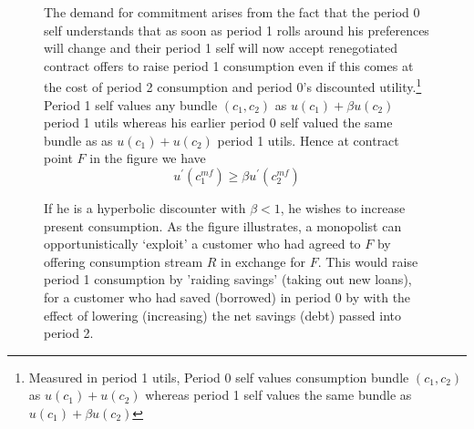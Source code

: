 \documentclass[11pt]{article}%
\begin{document}
\begin{figure}
The demand for commitment arises from the fact that the period 0 self understands that as soon as period 1 rolls around his preferences will change and their period 1 self will now accept renegotiated contract offers to raise period 1 consumption even if this comes at the cost of period 2 consumption and period 0's discounted utility.\footnote{Measured in period 1 utils, Period 0 self values consumption bundle $(c_{1},c_{2})$ as $u(c_{1}) + u(c_{2})$ whereas period 1 self values the same bundle as $u(c_{1}) + \beta u(c_{2})$} Period 1 self values any bundle $(c_{1},c_{2})$ as $u(c_{1}) + \beta u(c_{2})$ period 1 utils whereas his earlier period 0 self valued the same bundle as as $u(c_{1}) + u(c_{2})$ period 1 utils.  Hence at contract point $F$ in the figure we have
\[
u^{\prime}\left(  c_{1}^{mf}\right)  \geq\beta u^{\prime}\left(  c_{2}%
^{mf}\right)
\]

If he is a hyperbolic discounter with $\beta<1$, he wishes to increase present
consumption. As the figure illustrates, a monopolist can opportunistically `exploit' a customer who had agreed to $F$ by offering consumption stream $R$ in exchange for $F$\( \). This would raise period 1 consumption by 'raiding savings' (taking out new loans), for a customer who had saved (borrowed) in period 0 by with the effect of lowering (increasing) the net savings (debt) passed into period 2.

\begin{figure}[ptb]
\centering
{}


\end{figure}
\end{figure}
\end{document}
